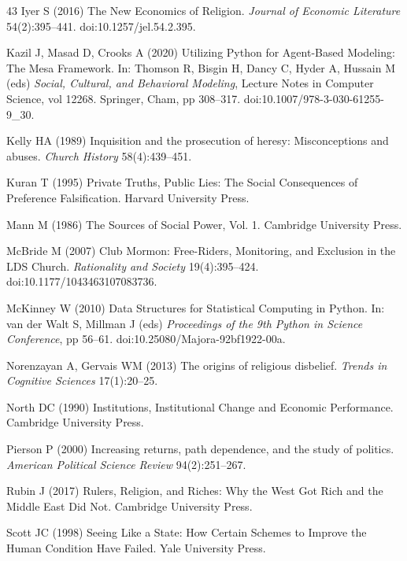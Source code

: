 \documentclass[12pt]{article}
\begin{document}
\begin{thebibliography}{43}
Iyer S (2016) The New Economics of Religion. \textit{Journal of Economic Literature} 54(2):395--441. doi:10.1257/jel.54.2.395.

Kazil J, Masad D, Crooks A (2020) Utilizing Python for Agent-Based Modeling: The Mesa Framework. In: Thomson R, Bisgin H, Dancy C, Hyder A, Hussain M (eds) \textit{Social, Cultural, and Behavioral Modeling}, Lecture Notes in Computer Science, vol 12268. Springer, Cham, pp 308--317. doi:10.1007/978-3-030-61255-9\_30.

Kelly HA (1989) Inquisition and the prosecution of heresy: Misconceptions and abuses. \textit{Church History} 58(4):439--451.

Kuran T (1995) Private Truths, Public Lies: The Social Consequences of Preference Falsification. Harvard University Press.

Mann M (1986) The Sources of Social Power, Vol. 1. Cambridge University Press.

McBride M (2007) Club Mormon: Free-Riders, Monitoring, and Exclusion in the LDS Church. \textit{Rationality and Society} 19(4):395--424. doi:10.1177/1043463107083736.

McKinney W (2010) Data Structures for Statistical Computing in Python. In: van der Walt S, Millman J (eds) \textit{Proceedings of the 9th Python in Science Conference}, pp 56--61. doi:10.25080/Majora-92bf1922-00a.

Norenzayan A, Gervais WM (2013) The origins of religious disbelief. \textit{Trends in Cognitive Sciences} 17(1):20--25.

North DC (1990) Institutions, Institutional Change and Economic Performance. Cambridge University Press.

Pierson P (2000) Increasing returns, path dependence, and the study of politics. \textit{American Political Science Review} 94(2):251--267.

Rubin J (2017) Rulers, Religion, and Riches: Why the West Got Rich and the Middle East Did Not. Cambridge University Press.

Scott JC (1998) Seeing Like a State: How Certain Schemes to Improve the Human Condition Have Failed. Yale University Press.


\end{thebibliography}
\end{document}
